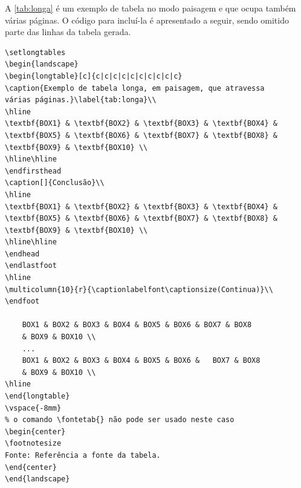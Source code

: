 A \autoref{tab:longa} é um exemplo de tabela no modo paisagem e que ocupa também várias páginas. O código para incluí-la é apresentado a seguir, sendo omitido parte das linhas da tabela gerada.

\begin{verbatim}
\setlongtables
\begin{landscape}
\begin{longtable}[c]{c|c|c|c|c|c|c|c|c|c}
\caption{Exemplo de tabela longa, em paisagem, que atravessa 
várias páginas.}\label{tab:longa}\\
\hline
\textbf{BOX1} & \textbf{BOX2} & \textbf{BOX3} & \textbf{BOX4} & 
\textbf{BOX5} & \textbf{BOX6} & \textbf{BOX7} & \textbf{BOX8} & 
\textbf{BOX9} & \textbf{BOX10} \\
\hline\hline
\endfirsthead
\caption[]{Conclusão}\\
\hline
\textbf{BOX1} & \textbf{BOX2} & \textbf{BOX3} & \textbf{BOX4} & 
\textbf{BOX5} & \textbf{BOX6} & \textbf{BOX7} & \textbf{BOX8} & 
\textbf{BOX9} & \textbf{BOX10} \\
\hline\hline
\endhead
\endlastfoot
\hline
\multicolumn{10}{r}{\captionlabelfont\captionsize(Continua)}\\
\endfoot
	
	BOX1 & BOX2 & BOX3 & BOX4 & BOX5 & BOX6 & BOX7 & BOX8 
	& BOX9 & BOX10 \\
	...
	BOX1 & BOX2 & BOX3 & BOX4 & BOX5 & BOX6 &	BOX7 & BOX8 
	& BOX9 & BOX10 \\
\hline
\end{longtable}
\vspace{-8mm}
% o comando \fontetab{} não pode ser usado neste caso
\begin{center}
\footnotesize
Fonte: Referência a fonte da tabela.
\end{center}
\end{landscape}

\end{verbatim}

